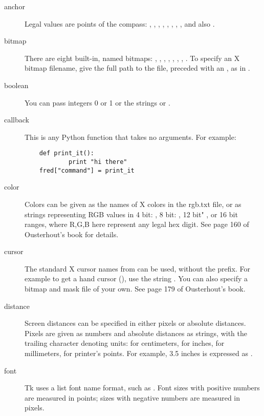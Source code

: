 \begin{description}
\item[anchor]
Legal values are points of the compass: ,
, , , ,
, , , and also
.

\item[bitmap]
There are eight built-in, named bitmaps: , ,
, , , ,
, .  To specify an X bitmap
filename, give the full path to the file, preceded with an ,
as in .

\item[boolean]
You can pass integers 0 or 1 or the strings  or  .

\item[callback]
This is any Python function that takes no arguments.  For example: 
\begin{verbatim}
    def print_it():
            print "hi there"
    fred["command"] = print_it
\end{verbatim}

\item[color]
Colors can be given as the names of X colors in the rgb.txt file,
or as strings representing RGB values in 4 bit: , 8
bit: , 12 bit" , or 16 bit
 ranges, where R,G,B here represent any
legal hex digit.  See page 160 of Ousterhout's book for details.  

\item[cursor]
The standard X cursor names from  can be used,
without the  prefix.  For example to get a hand cursor
(), use the string .  You can also
specify a bitmap and mask file of your own.  See page 179 of
Ousterhout's book.

\item[distance]
Screen distances can be specified in either pixels or absolute
distances.  Pixels are given as numbers and absolute distances as
strings, with the trailing character denoting units: 
for centimeters,  for inches,  for millimeters,
 for printer's points.  For example, 3.5 inches is expressed
as .

\item[font]
Tk uses a list font name format, such as .
Font sizes with positive numbers are measured in points;
sizes with negative numbers are measured in pixels.


\end{description}

